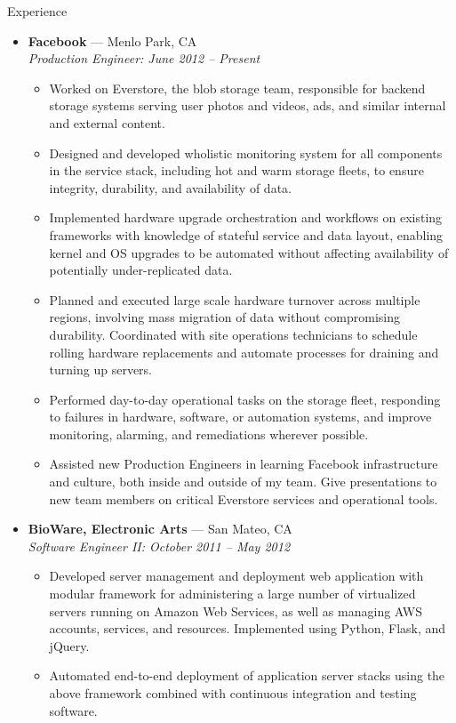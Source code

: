 \documentclass[11pt,oneside]{article}
\newenvironment{ressection}[1]{
    \vspace{8pt}
    {\fontfamily{phv}\selectfont\Large#1}
    \begin{itemize}
    \vspace{3pt}
}{
    \end{itemize}
}
\newcommand{\ressubitem}[1]{
    \vspace{-1pt}
    \item \begin{flushleft} #1 \end{flushleft}
}
\newcommand{\resbigitem}[3]{
    \vspace{-5pt}
    \item
    \textbf{#1} --- #2 \\
    \textit{#3}
}
\newenvironment{ressubsec}[3]{
    \resbigitem{#1}{#2}{#3}
    \vspace{-2pt}
    \begin{itemize}
}{
    \end{itemize}
}
\begin{document}
\begin{ressection}{Experience}

    \begin{ressubsec}{Facebook}{Menlo Park, CA}
    {Production Engineer: June 2012 -- Present}
        \ressubitem{Worked on Everstore, the blob storage team, responsible for backend
            storage systems serving user photos and videos, ads, and similar internal
            and external content.}
        \ressubitem{Designed and developed wholistic monitoring system for all components
            in the service stack, including hot and warm storage fleets, to ensure integrity,
            durability, and availability of data.}
        \ressubitem{Implemented hardware upgrade orchestration and workflows on existing
            frameworks with knowledge of stateful service and data layout, enabling kernel
            and OS upgrades to be automated without affecting availability of potentially
            under-replicated data.}
        \ressubitem{Planned and executed large scale hardware turnover across multiple
            regions, involving mass migration of data without compromising durability.
            Coordinated with site operations technicians to schedule rolling hardware
            replacements and automate processes for draining and turning up servers.}
        \ressubitem{Performed day-to-day operational tasks on the storage fleet, responding
            to failures in hardware, software, or automation systems, and improve monitoring,
            alarming, and remediations wherever possible.}
        \ressubitem{Assisted new Production Engineers in learning Facebook infrastructure
            and culture, both inside and outside of my team. Give presentations to new team
            members on critical Everstore services and operational tools.}
    \end{ressubsec}

    \begin{ressubsec}{BioWare, Electronic Arts}{San Mateo, CA}
    {Software Engineer II: October 2011 -- May 2012}
        \ressubitem{Developed server management and deployment web application with
        modular framework for administering a large number of virtualized servers
        running on Amazon Web Services, as well as managing AWS accounts, services, and
        resources.  Implemented using Python, Flask, and jQuery.}
        \ressubitem{Automated end-to-end deployment of application server stacks using
            the above framework combined with continuous integration and testing software.}
    \end{ressubsec}

\end{ressection}
\end{document}
